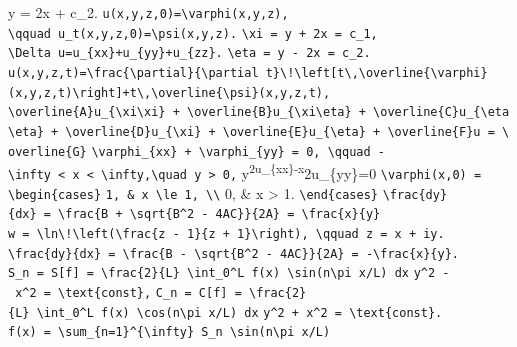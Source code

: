 \documentclass[
  ukrainian,
]{article}
\begin{document}
y = 2x + c\_2. \texttt{u(x,y,z,0)=\textbackslash{}varphi(x,y,z),}
\texttt{\textbackslash{}qquad\ u\_t(x,y,z,0)=\textbackslash{}psi(x,y,z).}
\texttt{\textbackslash{}xi\ =\ y\ +\ 2x\ =\ c\_1,}
\texttt{\textbackslash{}Delta\ u=u\_\{xx\}+u\_\{yy\}+u\_\{zz\}.}
\texttt{\textbackslash{}eta\ =\ y\ -\ 2x\ =\ c\_2.}
\texttt{u(x,y,z,t)=\textbackslash{}frac\{\textbackslash{}partial\}\{\textbackslash{}partial\ t\}\textbackslash{}!\textbackslash{}left{[}t\textbackslash{},\textbackslash{}overline\{\textbackslash{}varphi\}(x,y,z,t)\textbackslash{}right{]}+t\textbackslash{},\textbackslash{}overline\{\textbackslash{}psi\}(x,y,z,t),}
\texttt{\textbackslash{}overline\{A\}u\_\{\textbackslash{}xi\textbackslash{}xi\}\ +\ \textbackslash{}overline\{B\}u\_\{\textbackslash{}xi\textbackslash{}eta\}\ +\ \textbackslash{}overline\{C\}u\_\{\textbackslash{}eta\textbackslash{}eta\}\ +\ \textbackslash{}overline\{D\}u\_\{\textbackslash{}xi\}\ +\ \textbackslash{}overline\{E\}u\_\{\textbackslash{}eta\}\ +\ \textbackslash{}overline\{F\}u\ =\ \textbackslash{}overline\{G\}}
\texttt{\textbackslash{}varphi\_\{xx\}\ +\ \textbackslash{}varphi\_\{yy\}\ =\ 0,\ \textbackslash{}qquad\ -\textbackslash{}infty\ \textless{}\ x\ \textless{}\ \textbackslash{}infty,\textbackslash{}quad\ y\ \textgreater{}\ 0,}
y\textsuperscript{2u\_\{xx\}-x}2u\_\{yy\}=0
\texttt{\textbackslash{}varphi(x,0)\ =}
\texttt{\textbackslash{}begin\{cases\}}
\texttt{1,\ \&\ \textbar{}x\textbar{}\ \textbackslash{}le\ 1,\ \textbackslash{}\textbackslash{}}
0, \& \textbar x\textbar{} \textgreater{} 1.
\texttt{\textbackslash{}end\{cases\}}
\texttt{\textbackslash{}frac\{dy\}\{dx\}\ =\ \textbackslash{}frac\{B\ +\ \textbackslash{}sqrt\{B\^{}2\ -\ 4AC\}\}\{2A\}\ =\ \textbackslash{}frac\{x\}\{y\}}
\texttt{w\ =\ \textbackslash{}ln\textbackslash{}!\textbackslash{}left(\textbackslash{}frac\{z\ -\ 1\}\{z\ +\ 1\}\textbackslash{}right),\ \textbackslash{}qquad\ z\ =\ x\ +\ iy.}
\texttt{\textbackslash{}frac\{dy\}\{dx\}\ =\ \textbackslash{}frac\{B\ -\ \textbackslash{}sqrt\{B\^{}2\ -\ 4AC\}\}\{2A\}\ =\ -\textbackslash{}frac\{x\}\{y\}.}
\texttt{S\_n\ =\ S{[}f{]}\ =\ \textbackslash{}frac\{2\}\{L\}\ \textbackslash{}int\_0\^{}L\ f(x)\ \textbackslash{}sin(n\textbackslash{}pi\ x/L)\ dx}
\texttt{y\^{}2\ -\ x\^{}2\ =\ \textbackslash{}text\{const\},}
\texttt{C\_n\ =\ C{[}f{]}\ =\ \textbackslash{}frac\{2\}\{L\}\ \textbackslash{}int\_0\^{}L\ f(x)\ \textbackslash{}cos(n\textbackslash{}pi\ x/L)\ dx}
\texttt{y\^{}2\ +\ x\^{}2\ =\ \textbackslash{}text\{const\}.}
\texttt{f(x)\ =\ \textbackslash{}sum\_\{n=1\}\^{}\{\textbackslash{}infty\}\ S\_n\ \textbackslash{}sin(n\textbackslash{}pi\ x/L)}
\end{document}
